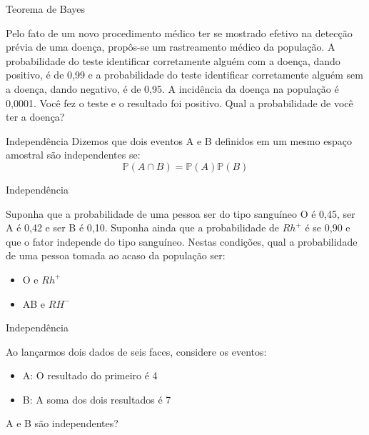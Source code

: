 \begin{frame}{Teorema de Bayes}
\begin{exemplo}[6]
        Pelo fato de um novo procedimento médico ter se mostrado efetivo na detecção prévia de uma doença, propôs-se um rastreamento médico da população. A probabilidade do teste identificar corretamente alguém com a doença, dando positivo, é de 0,99 e a probabilidade do teste identificar corretamente alguém sem a doença, dando negativo, é de 0,95. A incidência da doença na população é 0,0001. Você fez o teste e o resultado foi positivo. Qual a probabilidade de você ter a doença?
\end{exemplo}

\end{frame}

\begin{frame}{Independência}
    Dizemos que dois eventos A e B definidos em um mesmo espaço amostral são independentes se:
    $$\mathds{P}(A\cap B) = \mathds{P}(A) \mathds{P}(B)$$
\end{frame}

\begin{frame}{Independência}
\begin{exemplo}[7]
    Suponha que a probabilidade de uma pessoa ser do tipo sanguíneo O é 0,45, ser A é 0,42 e ser B é 0,10. Suponha ainda que a probabilidade de $Rh^+$ é se 0,90 e que o fator independe do tipo sanguíneo. Nestas condições, qual a probabilidade de uma pessoa tomada ao acaso da população ser:

    \begin{itemize}
        \item O e $Rh^+$
        \item AB e $RH^-$
    \end{itemize}
\end{exemplo}
    
\end{frame}

\begin{frame}{Independência}

\begin{exemplo}
    Ao lançarmos dois dados de seis faces, considere os eventos:
    \begin{itemize}
        \item A: O resultado do primeiro é 4
        \item B: A soma dos dois resultados é 7
    \end{itemize}

    A e B são independentes?
\end{exemplo}
    
\end{frame}

